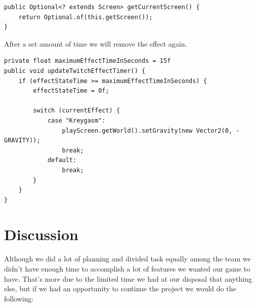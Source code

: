 \documentclass[12p]{article}
\begin{document}
\begin{verbatim}
public Optional<? extends Screen> getCurrentScreen() {
    return Optional.of(this.getScreen());
}
\end{verbatim}

After a set amount of time we will remove the effect again.

\begin{verbatim}
private float maximumEffectTimeInSeconds = 15f
public void updateTwitchEffectTimer() {
    if (effectStateTime >= maximumEffectTimeInSeconds) {
        effectStateTime = 0f;

        switch (currentEffect) {
            case "Kreygasm":
                playScreen.getWorld().setGravity(new Vector2(0, - GRAVITY));
                break;
            default:
                break;
        }
    }
}
\end{verbatim}


\newpage
\section{Discussion} \label{Discussion}

Although we did a lot of planning and divided task equally among the team we didn't have enough time to accomplish a lot of features we wanted our game to have. That's more due to the limited time we had at our disposal that anything else, but if we had an opportunity to continue the project we would do the following:
\end{document}
